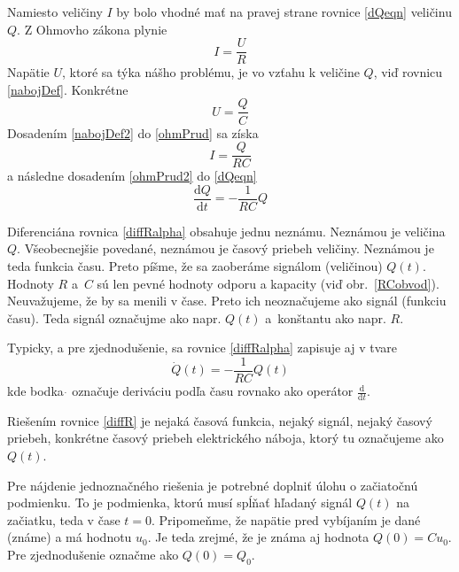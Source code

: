 \documentclass[a4paper, 10pt, ]{article}
\begin{document}
\bigskip

Namiesto veličiny $I$ by bolo vhodné mať na pravej strane rovnice \eqref{dQeqn} veličinu $Q$.
Z Ohmovho zákona plynie
\begin{equation} \label{ohmPrud}
    I = \frac{U}{R}
\end{equation}
Napätie $U$, ktoré sa týka nášho problému, je vo vzťahu k veličine $Q$, viď rovnicu  \eqref{nabojDef}. Konkrétne
\begin{equation} \label{nabojDef2}
    U = \frac{Q}{C}
\end{equation}
Dosadením \eqref{nabojDef2} do \eqref{ohmPrud} sa získa
\begin{equation} \label{ohmPrud2}
    I = \frac{Q}{RC}
\end{equation}
a následne dosadením \eqref{ohmPrud2} do \eqref{dQeqn}
\begin{equation} \label{diffRalpha}
    \frac{\text{d}Q}{\text{d}t} = - \frac{1}{RC} Q
\end{equation}

Diferenciána rovnica \eqref{diffRalpha} obsahuje jednu neznámu. Neznámou je veličina $Q$. Všeobecnejšie povedané, neznámou je časový priebeh veličiny. Neznámou je teda funkcia času. Preto píšme, že sa zaoberáme signálom (veličinou) $Q(t)$. Hodnoty $R$ a~$C$ sú len pevné hodnoty odporu a kapacity (viď obr.~\ref{RCobvod}). Neuvažujeme, že by sa menili v čase. Preto ich neoznačujeme ako signál (funkciu času). Teda signál označujme ako napr. $Q(t)$ a~konštantu ako napr. $R$.

Typicky, a pre zjednodušenie, sa rovnice \eqref{diffRalpha} zapisuje aj v tvare
\begin{equation} \label{diffR}
    \dot Q(t) = - \frac{1}{RC} Q(t)
\end{equation}
kde bodka $\dot{}$ označuje deriváciu podľa času rovnako ako operátor $\frac{\text{d}}{\text{d}t}$.


\bigskip

Riešením rovnice \eqref{diffR} je nejaká časová funkcia, nejaký signál, nejaký časový priebeh, konkrétne časový priebeh elektrického náboja, ktorý tu označujeme ako $Q(t)$.

Pre nájdenie jednoznačného riešenia je potrebné doplniť úlohu o začiatočnú podmienku. To je podmienka, ktorú musí spĺňať hľadaný signál $Q(t)$ na začiatku, teda v čase $t=0$. Pripomeňme, že napätie pred vybíjaním je dané (známe) a má hodnotu $u_0$. Je teda zrejmé, že je známa aj hodnota $Q(0) = C u_0$. Pre zjednodušenie označme ako $Q(0) = Q_0$.
\end{document}
